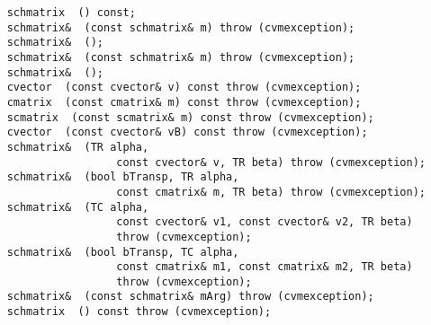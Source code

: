 \verb"    schmatrix "\verb" () const;"\\
\verb"    schmatrix& "\verb" (const schmatrix& m) throw (cvmexception);"\\
\verb"    schmatrix& "\verb" ();"\\
\verb"    schmatrix& "\verb" (const schmatrix& m) throw (cvmexception);"\\
\verb"    schmatrix& "\verb" ();"\\
\verb"    cvector "\verb" (const cvector& v) const throw (cvmexception);"\\
\verb"    cmatrix "\verb" (const cmatrix& m) const throw (cvmexception);"\\
\verb"    scmatrix "\verb" (const scmatrix& m) const throw (cvmexception);"\\
\verb"    cvector "\verb" (const cvector& vB) const throw (cvmexception);"\\
\verb"    schmatrix& "\verb" (TR alpha,"\\
\verb"                     const cvector& v, TR beta) throw (cvmexception);"\\
\verb"    schmatrix& "\verb" (bool bTransp, TR alpha,"\\
\verb"                     const cmatrix& m, TR beta) throw (cvmexception);"\\
\verb"    schmatrix& "\verb" (TC alpha,"\\
\verb"                     const cvector& v1, const cvector& v2, TR beta)"\\
\verb"                     throw (cvmexception);"\\
\verb"    schmatrix& "\verb" (bool bTransp, TC alpha,"\\
\verb"                     const cmatrix& m1, const cmatrix& m2, TR beta)"\\
\verb"                     throw (cvmexception);"\\
\verb"    schmatrix& "\verb" (const schmatrix& mArg) throw (cvmexception);"\\
\verb"    schmatrix "\verb" () const throw (cvmexception);"\\
